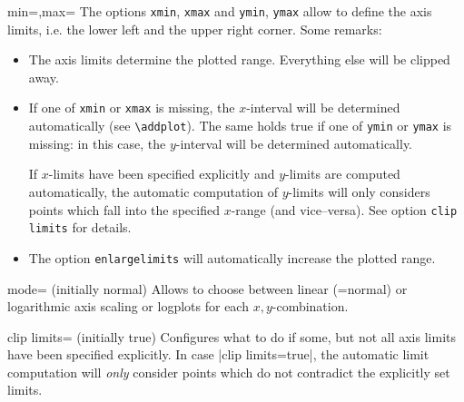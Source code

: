 \begin{pgfplotsxykeylist}{\x min=,\x max=}
The options \texttt{xmin}, \texttt{xmax} and \texttt{ymin}, \texttt{ymax} allow to define the axis limits, i.e. the lower left and the upper right corner. Some remarks:
\begin{itemize}
	\item The axis limits determine the plotted range. Everything else will be clipped away.
	\item If one of \lstinline!xmin! or \lstinline!xmax! is missing, the $x$-interval will be determined automatically (see \lstinline!\addplot!). The same holds true if one of \lstinline!ymin! or \lstinline!ymax! is missing: in this case, the $y$-interval will be determined automatically.

	If $x$-limits have been specified explicitly and $y$-limits are computed automatically, the automatic computation of $y$-limits will only considers points which fall into the specified $x$-range (and vice--versa). See option \texttt{clip limits} for details.

	\item The option \lstinline!enlargelimits! will automatically increase the plotted range.
\end{itemize}
\end{pgfplotsxykeylist}

\begin{pgfplotsxykey}{\x mode= (initially normal)}
Allows to choose between linear (=normal) or logarithmic axis scaling or logplots for each $x,y$-combination.
\end{pgfplotsxykey}

\begin{pgfplotskey}{clip limits= (initially true)}
	Configures what to do if some, but not all axis limits have been specified explicitly. In case |clip limits=true|, the automatic limit computation will \emph{only} consider points which do not contradict the explicitly set limits. 
\end{pgfplotskey}

